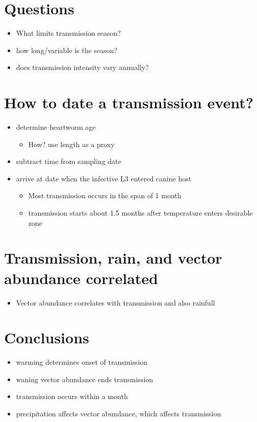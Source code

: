 \documentclass{article}
\begin{document}
    \section{Questions}
        \begin{itemize}
            \item What limits transmission season?
            \item how long/variable is the season?
            \item does transmission intensity vary annually?
        \end{itemize}

    \section{How to date a transmission event?}
        \begin{itemize}
            \item determine heartworm age
            \begin{itemize}
                \item How?  use length as a proxy
            \end{itemize}
            \item subtract time from sampling date
            \item arrive at date when the infective L3 entered canine host
            \begin{itemize}
                \item Most transmission occurs in the span of 1 month
                \item transmission starts about 1.5 months after temperature enters desirable zone
            \end{itemize}
        \end{itemize}

    \section{Transmission, rain, and vector abundance correlated}
        \begin{itemize}
            \item Vector abundance correlates with transmission and also rainfull
        \end{itemize}

    \section{Conclusions}
        \begin{itemize}
            \item warming determines onset of transmission
            \item waning vector abundance ends transmission
            \item transmission occurs within a month
            \item precipitation affects vector abundance, which affects transmission
        \end{itemize}
\end{document}
